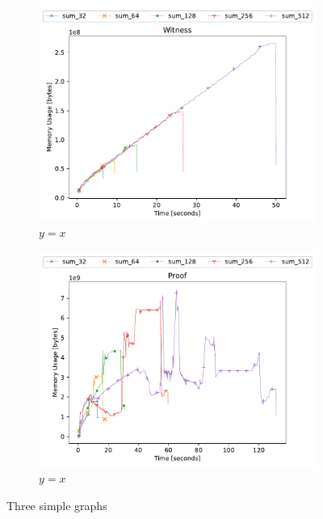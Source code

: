 \begin{figure}[h]
    \centering
    \begin{subfigure}[t]{0.49\textwidth}
        \centering
        \includegraphics[width=1\textwidth]{benchmarks/witness.pdf}
        \caption{$y=x$}
        \label{fig:y equals x}
    \end{subfigure}
    \hfill
    \begin{subfigure}[t]{0.49\textwidth}
        \centering
        \includegraphics[width=1\textwidth]{benchmarks/proof.pdf}
        \caption{$y=x$}
        \label{fig:y equals x}
    \end{subfigure}
    \caption{Three simple graphs}
    \label{fig:three graphs}
\end{figure}

